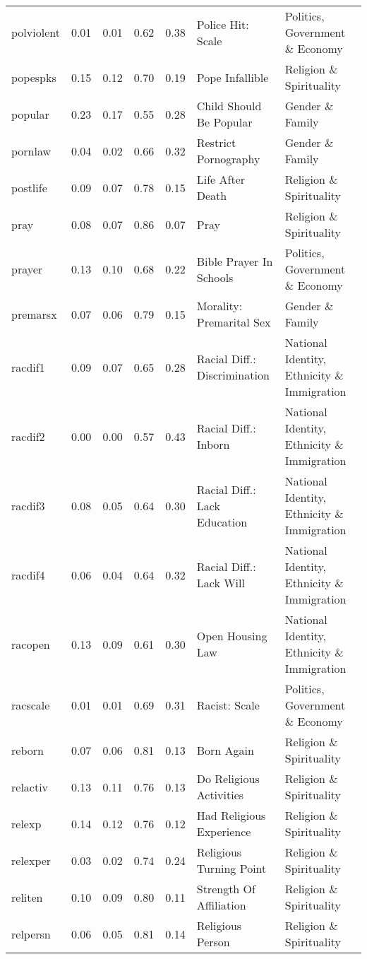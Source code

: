 \begin{longtable}{l|rrrrll}
polviolent & 0.01 & 0.01 & 0.62 & 0.38 & Police Hit: Scale & Politics, Government \& Economy \\ 
popespks & 0.15 & 0.12 & 0.70 & 0.19 & Pope Infallible & Religion \& Spirituality \\ 
popular & 0.23 & 0.17 & 0.55 & 0.28 & Child Should Be Popular & Gender \& Family \\ 
pornlaw & 0.04 & 0.02 & 0.66 & 0.32 & Restrict Pornography & Gender \& Family \\ 
postlife & 0.09 & 0.07 & 0.78 & 0.15 & Life After Death & Religion \& Spirituality \\ 
pray & 0.08 & 0.07 & 0.86 & 0.07 & Pray & Religion \& Spirituality \\ 
prayer & 0.13 & 0.10 & 0.68 & 0.22 & Bible Prayer In Schools & Politics, Government \& Economy \\ 
premarsx & 0.07 & 0.06 & 0.79 & 0.15 & Morality: Premarital Sex & Gender \& Family \\ 
racdif1 & 0.09 & 0.07 & 0.65 & 0.28 & Racial Diff.: Discrimination & National Identity, Ethnicity \& Immigration \\ 
racdif2 & 0.00 & 0.00 & 0.57 & 0.43 & Racial Diff.: Inborn & National Identity, Ethnicity \& Immigration \\ 
racdif3 & 0.08 & 0.05 & 0.64 & 0.30 & Racial Diff.: Lack Education & National Identity, Ethnicity \& Immigration \\ 
racdif4 & 0.06 & 0.04 & 0.64 & 0.32 & Racial Diff.: Lack Will & National Identity, Ethnicity \& Immigration \\ 
racopen & 0.13 & 0.09 & 0.61 & 0.30 & Open Housing Law & National Identity, Ethnicity \& Immigration \\ 
racscale & 0.01 & 0.01 & 0.69 & 0.31 & Racist: Scale & Politics, Government \& Economy \\ 
reborn & 0.07 & 0.06 & 0.81 & 0.13 & Born Again & Religion \& Spirituality \\ 
relactiv & 0.13 & 0.11 & 0.76 & 0.13 & Do Religious Activities & Religion \& Spirituality \\ 
relexp & 0.14 & 0.12 & 0.76 & 0.12 & Had Religious Experience & Religion \& Spirituality \\ 
relexper & 0.03 & 0.02 & 0.74 & 0.24 & Religious Turning Point & Religion \& Spirituality \\ 
reliten & 0.10 & 0.09 & 0.80 & 0.11 & Strength Of Affiliation & Religion \& Spirituality \\ 
relpersn & 0.06 & 0.05 & 0.81 & 0.14 & Religious Person & Religion \& Spirituality \\ 

\end{longtable}
